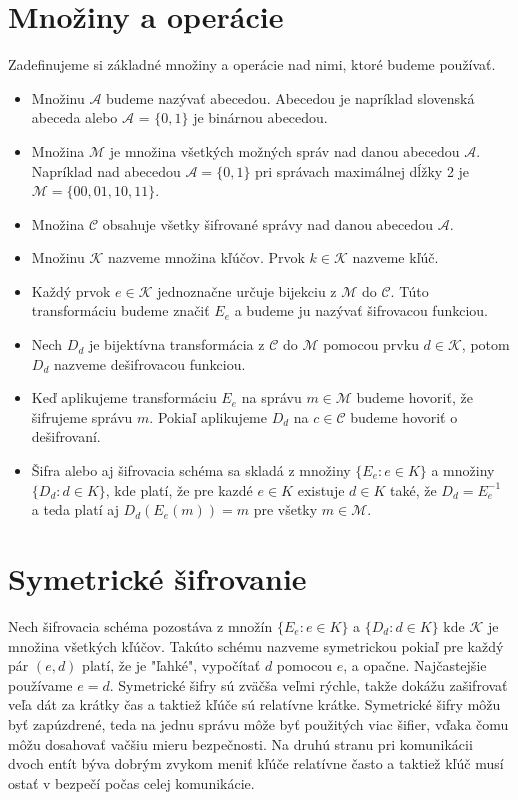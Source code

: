 \section{Množiny a operácie}
	Zadefinujeme si základné množiny a operácie nad nimi, ktoré budeme používať.
	\begin{itemize}
	\item Množinu $\mathcal A$ budeme nazývať abecedou. Abecedou je napríklad slovenská abeceda alebo $\mathcal A$ =  $\{0,1\}$ je binárnou abecedou.
	\item Množina $\mathcal M$ je množina všetkých možných správ nad danou abecedou $\mathcal A$. Napríklad nad abecedou $\mathcal A = \{0,1\}$ pri správach maximálnej dĺžky 2 je  $ \mathcal M = \{00,01,10,11\}$.
	\item Množina $\mathcal C$ obsahuje všetky šifrované správy nad danou abecedou $\mathcal A$.  
	\item Množinu $\mathcal K$ nazveme množina kľúčov. Prvok $k \in\mathcal K$ nazveme kľúč.
	\item Každý prvok $e \in \mathcal K$ jednoznačne určuje bijekciu z $\mathcal M$ do $\mathcal C$. Túto transformáciu budeme značiť $E_e$ a budeme ju nazývať šifrovacou funkciou.
	\item Nech $D_d$ je bijektívna transformácia z $\mathcal C$ do $\mathcal M$ pomocou prvku  $d \in \mathcal K$, potom  $D_d$ nazveme dešifrovacou funkciou.
	\item Keď aplikujeme transformáciu $E_e$ na správu $m \in \mathcal M$ budeme hovoriť, že šifrujeme správu $m$. Pokiaľ aplikujeme $D_d$ na $c \in \mathcal C$ budeme hovoriť o dešifrovaní.
	\item Šifra alebo aj šifrovacia schéma sa skladá z množiny $\{E_e : e \in K\}$ a množiny $\{D_d : d \in K\}$, kde platí, že pre kazdé $e \in K$ existuje $d \in K$ také, že $D_d = E_e^{-1}$ a teda platí aj $D_d(E_e(m)) = m$ pre všetky $m \in \mathcal M$.  
	\end{itemize}

		
\section{Symetrické šifrovanie}
	Nech šifrovacia schéma pozostáva z množín $\{E_e : e \in K\}$ a $\{D_d: d \in K\}$ kde $\mathcal K$ je množina všetkých kľúčov. Takúto schému nazveme symetrickou pokiaľ pre každý pár $(e,d)$ platí, že je "ľahké", vypočítať $d$ pomocou $e$, a opačne. Najčastejšie používame $e = d$. Symetrické šifry sú zväčša veľmi rýchle, takže dokážu zašifrovať veľa dát za krátky čas a taktiež kľúče sú relatívne krátke. Symetrické šifry môžu byť zapúzdrené, teda na jednu správu môže byť použitých viac šifier, vďaka čomu môžu dosahovať vačšiu mieru bezpečnosti. Na druhú stranu pri komunikácii dvoch entít býva dobrým zvykom meniť kľúče relatívne často a taktiež kľúč musí ostať v bezpečí počas celej komunikácie.

